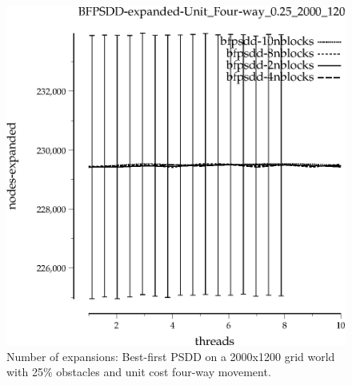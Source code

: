 \documentclass{article}
\begin{document}
\begin{figure}[t]
\begin{center}
\includegraphics{grid_unit_four-way_0.25_2000_1200/BFPSDD-expanded-Unit_Four-way_0.25_2000_1200.eps}
\caption{Number of expansions: Best-first PSDD on a 2000x1200 grid world with 25\%
  obstacles and unit cost four-way movement.}
\end{center}
\end{figure}
\end{document}
